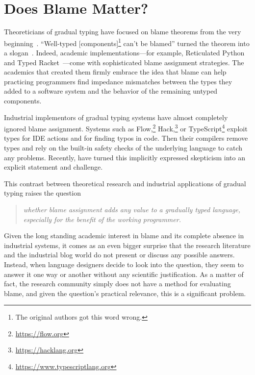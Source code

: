 \section{Does Blame Matter?}
\label{sec:introduction}

Theoreticians of gradual typing have focused on
blame theorems from the very beginning~\cite{mf-toplas-2009, tf-dls-2006}. ``Well-typed
[components]\footnote{The original authors got this word wrong.} can't be
blamed'' turned the theorem into a slogan~\cite{wf-esop-2009}. Indeed,
academic implementations---for example, Reticulated
Python~\cite{vsc-dls-2019, vss-popl-2017, vksb-dls-2014} and Typed
Racket~\cite{tf-dls-2006,tf-popl-2008,tfffgksst-snapl-2017,tf-icfp-2010}---come
with sophisticated blame assignment strategies. The academics that
created them firmly embrace the idea that blame can help practicing
programmers find impedance mismatches between the types they added to a
software system and the behavior of the remaining untyped components. 

Industrial implementors of  gradual typing systems have almost completely ignored blame assignment.
Systems such as Flow,\footnote{\url{https://flow.org}}
Hack,\footnote{\url{https://hacklang.org}} or
TypeScript\footnote{\url{https://www.typescriptlang.org}} exploit types for IDE actions and for finding typos in
code. Then their compilers remove types and rely on the built-in safety checks of
the underlying language to catch any problems. 
Recently, \citet{cc-snapl-19} have turned this implicitly expressed
skepticism into an explicit statement and challenge.

This contrast between theoretical research and industrial applications of gradual typing raises the question 
\begin{quote}
 \it
 whether blame assignment adds any value to a gradually typed language,
 especially for the benefit of the working programmer.
\end{quote}
Given the long standing academic interest in blame  and its complete absence in
industrial systems, it comes as an even bigger surprise that the research
literature and the industrial blog world do not present or discuss any
possible answers.  Instead, when language designers decide to look into the
question, they seem to answer it one way or another without any scientific
justification. As a matter of fact, the research community simply does not have a
method for evaluating blame, and given the question's practical
relevance, this is a significant problem.

